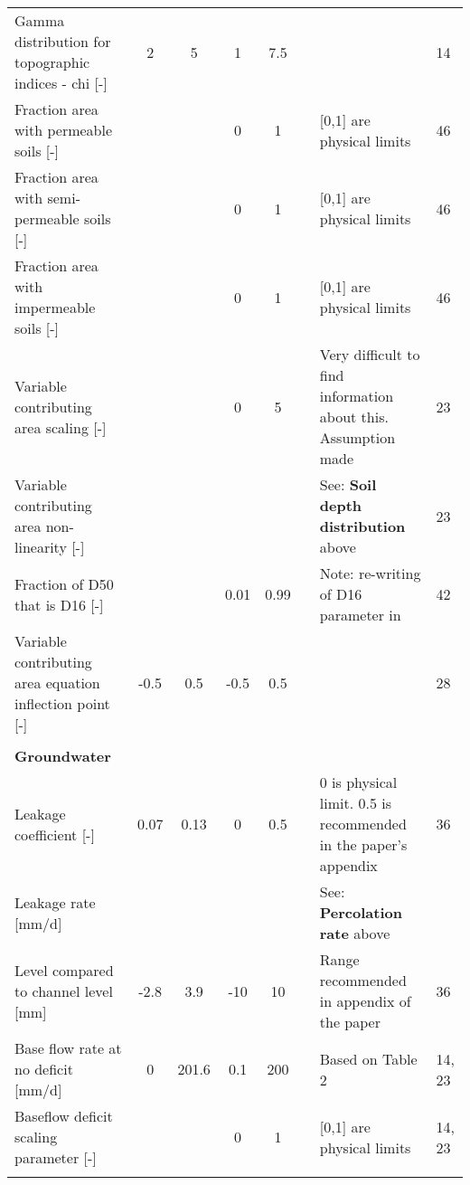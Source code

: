 \begin{longtable}{p{11.215em}ccccp{13em}p{13em}l}
    Gamma distribution for topographic indices - chi [-] & 2     & 5     & 1     & 7.5   & \cite{Clark2008a} & \multicolumn{1}{l}{} & 14 \\
    Fraction area with permeable soils [-] &       &       & 0     & 1     & \cite{Crooks2007} & [0,1] are physical limits & 46 \\
    Fraction area with semi-permeable soils [-] &       &       & 0     & 1     & \cite{Crooks2007} & [0,1] are physical limits & 46 \\
    Fraction area with impermeable soils [-] &       &       & 0     & 1     & \cite{Crooks2007} & [0,1] are physical limits & 46 \\
    Variable contributing area scaling [-]  &       &       & 0     & 5     & \cite{Sivapalan1996a} & Very difficult to find information about this. Assumption made  & 23 \\
    Variable contributing area non-linearity [-] &       &       &       &       & \cite{Sivapalan1996a} & See: \textbf{Soil depth distribution} above & 23 \\
    Fraction of D50 that is D16 [-] &       &       & 0.01  & 0.99  & \multicolumn{1}{l}{} & Note: re-writing of D16 parameter in \cite{Fukushima1988} & 42 \\
    Variable contributing area equation inflection point [-] & -0.5  & 0.5   & -0.5  & 0.5   & \cite{Jayawardena2000} & \multicolumn{1}{l}{} & 28 \\
    \multicolumn{1}{l}{} &       &       &       &       & \multicolumn{1}{l}{} & \multicolumn{1}{l}{} &  \\

\textbf{Groundwater} &       &       &       &       & \multicolumn{1}{l}{} & \multicolumn{1}{l}{} &  \\
    Leakage coefficient [-] & 0.07  & 0.13  & 0     & 0.5   & \cite{Chiew1994} & 0 is physical limit. 0.5 is recommended in the paper's appendix & 36 \\
    Leakage rate [mm/d] &       &       &       &       & \multicolumn{1}{l}{} & See: \textbf{Percolation rate} above &  \\
    Level compared to channel level [mm] & -2.8  & 3.9   & -10   & 10    & \cite{Chiew1994} & Range recommended in appendix of the paper & 36 \\
    Base flow rate at no deficit [mm/d] & 0     & 201.6 & 0.1   & 200   & \cite{Beven1997} & Based on Table 2 \citep{Beven1997} & \multicolumn{1}{p{10em}}{14, 23} \\
    Baseflow deficit scaling parameter [-] &       &       & 0     & 1     & \multicolumn{1}{l}{} & [0,1] are physical limits & \multicolumn{1}{p{10em}}{14, 23} \\
    \multicolumn{1}{l}{} &       &       &       &       & \multicolumn{1}{l}{} & \multicolumn{1}{l}{} &  \\


\end{longtable}
